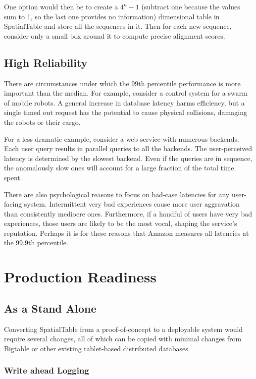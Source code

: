 \documentclass[11pt]{article}
\begin{document}
One option would then be to create a $4^n-1$ (subtract one because the values sum to 1, so the last one provides no information) dimensional table in SpatialTable and store all the sequences in it.  Then for each new sequence, consider only a small box around it to compute precise alignment scores.

\subsection{High Reliability}

There are circumstances under which the 99th percentile performance is more important than the median.  For example, consider a control system for a swarm of mobile robots. A general increase in database latency harms efficiency, but a single timed out request has the potential to cause physical collisions, damaging the robots or their cargo.  

For a less dramatic example, consider a web service with numerous backends.  Each user query results in parallel queries to all the backends.  The user-perceived latency is determined by the slowest backend.  Even if the queries are in sequence, the anomalously slow ones will account for a large fraction of the total time spent.

There are also psychological reasons to focus on bad-case latencies for any user-facing system.  Intermittent very bad experiences cause more user aggravation than consistently mediocre ones.\cite{psych}  Furthermore, if a handful of users have very bad experiences, those users are likely to be the most vocal, shaping the service's reputation.  Perhaps it is for these reasons that Amazon measures all latencies at the 99.9th percentile\cite{amazon}.

\section{Production Readiness}

\subsection{As a Stand Alone}

Converting SpatialTable from a proof-of-concept to a deployable system would require several changes, all of which can be copied with minimal changes from Bigtable or other existing tablet-based distributed databases.

\subsubsection{Write ahead Logging}
\end{document}
